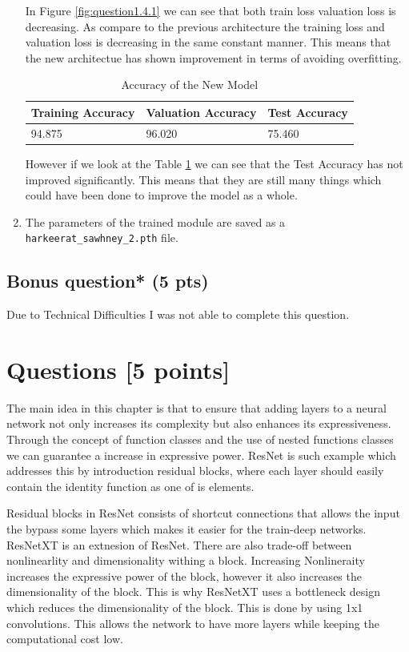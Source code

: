 \documentclass[a4paper]{article}
\newcommand{\codeword}[1]{\texttt{\textcolor{code}{#1}}}
\begin{document}
\begin{enumerate}
		In Figure \ref{fig:question1.4.1} we can see that both train loss valuation loss is decreasing. As compare to the previous architecture the training loss and valuation loss is decreasing in the same constant manner. This means that the new architectue has shown improvement in terms of avoiding overfitting.


		\begin{table}[H]
			\centering
			\begin{tabular}{|l|l|l|}
				\hline
				\textbf{Training Accuracy} & \textbf{Valuation Accuracy} & \textbf{Test Accuracy} \\
				\hline
				94.875                     & 96.020                      & 75.460                 \\

				\hline
			\end{tabular}
			\caption{Accuracy of the New Model}
			\label{tab:question1.5.1}
		\end{table}

		However if we look at the Table \ref{tab:question1.5.1} we can see that the Test Accuracy has not improved significantly. This means that they are still many things which could have been done to improve the model as a whole. 

	\item The parameters of the trained module are saved as a \codeword{harkeerat\_sawhney\_2.pth} file.
\end{enumerate}



\subsection{Bonus question* (5 pts)}
Due to Technical Difficulties I was not able to complete this question.

\section*{Questions [5 points]}
The main idea in this chapter is that to ensure that adding layers to a neural network not only increases its complexity but also enhances its expressiveness. Through the concept of function classes and the use of nested functions classes we can guarantee a increase in expressive power. ResNet is such example which addresses this by introduction residual blocks, where each layer should easily contain the identity function as one of is elements. 

Residual blocks in ResNet consists of shortcut connections that allows the input the bypass some layers which makes it easier for the train-deep networks. ResNetXT is an extnesion of ResNet. There are also trade-off between nonlinearlity and dimensionality withing a block. Increasing Nonlineraity increases the expressive power of the block, however it also increases the dimensionality of the block. This is why ResNetXT uses a bottleneck design which reduces the dimensionality of the block. This is done by using 1x1 convolutions. This allows the network to have more layers while keeping the computational cost low.
\end{document}
